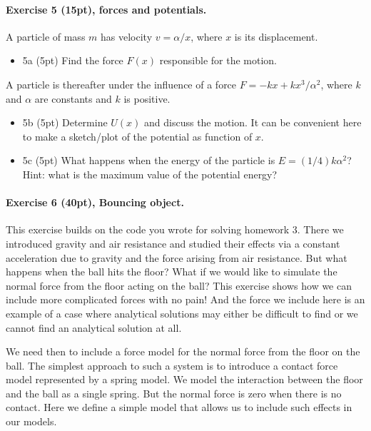 \documentclass[%
oneside,                 %
final,                   %
10pt]{article}
\begin{document}
\noindent
\paragraph{Exercise 5 (15pt), forces  and potentials.}
A particle of mass $m$ has velocity $v=\alpha/x$, where $x$ is its displacement.

\begin{itemize}
\item 5a (5pt) Find the force $F(x)$ responsible for the motion.
\end{itemize}

\noindent
A particle is thereafter under the influence of a force $F=-kx+kx^3/\alpha^2$, where $k$ and $\alpha$ are constants and $k$ is positive.

\begin{itemize}
\item 5b (5pt) Determine $U(x)$  and discuss the motion. It can be convenient here to make a sketch/plot of the potential as function of $x$.

\item 5c (5pt)  What happens when the energy of the particle is $E=(1/4)k\alpha^2$? Hint: what is the maximum value of the potential energy?
\end{itemize}

\noindent
\paragraph{Exercise 6 (40pt), Bouncing object.}
This exercise builds on the code you wrote for solving homework 3.
There we introduced gravity and air resistance and studied their
effects via a constant acceleration due to gravity and the force
arising from air resistance. But what happens when the ball hits the
floor? What if we would like to simulate the normal force from the
floor acting on the ball?  This exercise shows how we can include more
complicated forces with no pain! And the force we include here is an
example of a case where analytical solutions may either be difficult
to find or we cannot find an analytical solution at all.

We need then to include a force model for the normal force from the
floor on the ball. The simplest approach to such a system is to
introduce a contact force model represented by a spring model.  We
model the interaction between the floor and the ball as a single
spring. But the normal force is zero when there is no contact. Here we
define a simple model that allows us to include such effects in our
models.
\end{document}
